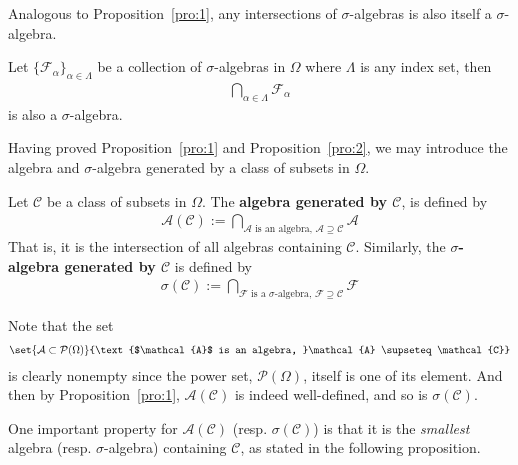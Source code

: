 \documentclass[thmcnt=section, 12pt, color=purple]{my-elegantbook}
\begin{document}
Analogous to Proposition~\ref{pro:1}, any intersections of $\sigma$-algebras
is also itself a $\sigma$-algebra.

\begin{proposition} \label{pro:2}
	Let $\{\mathcal{F}_\alpha\}_{\alpha \in \Lambda}$ 
	be a collection of $\sigma$-algebras in $\Omega$
	where $\Lambda$ is any index set,
	then 
	\begin{align*}
		\bigcap_{\alpha \in \Lambda} \mathcal{F}_{\alpha}
	\end{align*}
	is also a $\sigma$-algebra.
\end{proposition}


Having proved Proposition~\ref{pro:1} and Proposition~\ref{pro:2},
we may introduce the algebra and $\sigma$-algebra
generated by a class of subsets in $\Omega$.

\begin{definition} \label{def:4}
	Let $\mathcal{C}$ be a class of subsets in $\Omega$.
	The \textbf{algebra generated by $\mathcal{C}$}, 
	is defined by 
	\begin{align*}
		\mathcal{A}(\mathcal{C})
		:= \bigcap_{
			\text{$\mathcal{A}$ is an algebra, }\mathcal{A} 
			\supseteq \mathcal{C}
		} \mathcal{A} 
	\end{align*}
	That is, it is the intersection of all algebras 
	containing $\mathcal{C}$.
	Similarly, the \textbf{$\sigma$-algebra generated by $\mathcal{C}$}
	is defined by 
	\begin{align*}
		\sigma(\mathcal{C})
		:= \bigcap_{
			\text{$\mathcal{F}$ is a $\sigma$-algebra, }\mathcal{F} 
			\supseteq \mathcal{C}
		} \mathcal{F}
	\end{align*}
\end{definition}

Note that the set
\begin{align*}
	\set{\mathcal{A} \subset \mathcal{P}(\Omega)}
	{\text{$\mathcal{A}$ is an algebra, }\mathcal{A} \supseteq \mathcal{C}}
\end{align*}
is clearly nonempty since the power set, $\mathcal{P}(\Omega)$, 
itself is one of its element.
And then by Proposition~\ref{pro:1}, $\mathcal{A}(\mathcal{C})$
is indeed well-defined, and so is $\sigma(\mathcal{C})$.

One important property for $\mathcal{A}(\mathcal{C})$ 
(resp. $\sigma(\mathcal{C})$) is that 
it is the \textit{smallest} algebra (resp. $\sigma$-algebra) 
containing $\mathcal{C}$, as stated in the following proposition.
\end{document}
